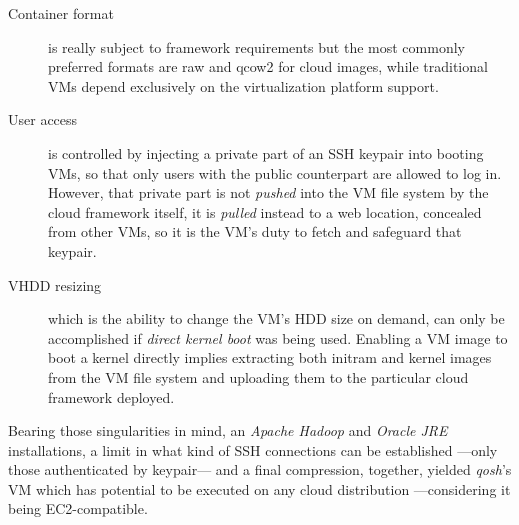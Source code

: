 \documentclass{sig-alternate}
\begin{document}
\begin{description}
 \item[Container format] is really subject to framework requirements but the most commonly preferred formats are raw and qcow2 for cloud images, while traditional VMs depend exclusively on the virtualization platform support.
 
 \item[User access] is controlled by injecting a private part of an SSH keypair into booting VMs, so that only users with the public counterpart are allowed to log in. However, that private part is not \emph{pushed} into the VM file system by the cloud framework itself, it is \emph{pulled} instead to a web location, concealed from other VMs, so it is the VM's duty to fetch and safeguard that keypair.
 
 \item[VHDD resizing] which is the ability to change the VM's HDD size on demand, can only be accomplished if \emph{direct kernel boot} was being used. Enabling a VM image to boot a kernel directly implies extracting both initram and kernel images from the VM file system and uploading them to the particular cloud framework deployed.
\end{description}

Bearing those singularities in mind, an \emph{Apache Hadoop} and \emph{Oracle JRE} installations, a limit in what kind of SSH connections can be established ---only those authenticated by keypair--- and a final compression, together, yielded \emph{qosh}'s VM \cite{ahvm:2013:online} which has potential to be executed on any cloud distribution ---considering it being EC2-compatible.

\end{document}
